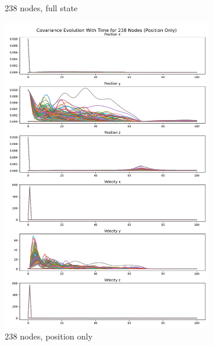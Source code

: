 \begin{figure}
\begin{subfigure}[b]{0.32\linewidth}
        \caption{238 nodes, full state}
        \label{fig:covariance-238-full}
    \end{subfigure}
    \hfill %
    \begin{subfigure}[b]{0.32\linewidth}
        \includegraphics[width=\linewidth]{CLOTH REPORT PICS/covariance 238 p.jpg}
        \caption{238 nodes, position only}
        \label{fig:covariance-238-pos}
    \end{subfigure}
    \hfill %
    \begin{subfigure}[b]{0.32\linewidth}

\end{subfigure}
\end{figure}
